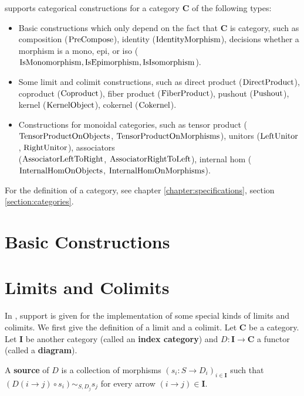 \CapPkg supports categorical constructions 
for a category $\mathbf{C}$
of the following types:

\begin{itemize}
 \item Basic constructions which only depend on the fact that $\mathbf{C}$ is category,
 such as composition ($\mathrm{PreCompose}$), identity ($\mathrm{IdentityMorphism}$), decisions whether
 a morphism is a mono, epi, or iso ($\mathrm{IsMonomorphism}, \mathrm{IsEpimorphism}, \mathrm{IsIsomorphism}$).
 \item Some limit and colimit constructions, such as direct product ($\mathrm{DirectProduct}$),
 coproduct ($\mathrm{Coproduct}$), fiber product ($\mathrm{FiberProduct}$), pushout ($\mathrm{Pushout}$),
 kernel ($\mathrm{KernelObject}$), cokernel ($\mathrm{Cokernel}$).
 \item Constructions for monoidal categories, such as tensor product ($\mathrm{TensorProductOnObjects}$, $\mathrm{TensorProductOnMorphisms}$),
 unitors ($\mathrm{LeftUnitor}$, $\mathrm{RightUnitor}$), associators \\($\mathrm{AssociatorLeftToRight}$, $\mathrm{AssociatorRightToLeft}$),
 internal hom ($\mathrm{InternalHomOnObjects}$, $\mathrm{InternalHomOnMorphisms}$).
\end{itemize}

\begin{notation}
 For the definition of a category, see chapter \ref{chapter:specifications}, section \ref{section:categories}.
\end{notation}


\section{Basic Constructions}

\section{Limits and Colimits}\label{section:universalobjects}

In \CapPkg, support is given for the implementation of some special kinds of limits and
colimits. We first give the definition of a limit and a colimit.
Let $\mathbf{C}$ be a category. Let $\mathbf{I}$ be another category (called an \textbf{index category}) and $D: \mathbf{I} \rightarrow \mathbf{C}$
a functor (called a \textbf{diagram}). 
\begin{definition} 
 A \textbf{source} of $D$ is a collection of morphisms $( s_i: S \rightarrow D_i)_{i \in \mathbf{I}}$ such that
 $\left( D( i \rightarrow j ) \circ s_i \right) \sim_{S,D_j} s_j$ for every arrow $(i \rightarrow j) \in \mathbf{I}$.
\end{definition}
 
